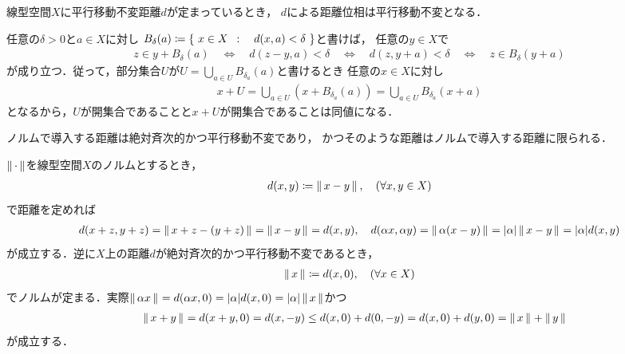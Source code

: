 	\begin{screen}
		\begin{thm}[平行移動不変距離による距離位相は平行移動不変]
			線型空間$X$に平行移動不変距離$d$が定まっているとき，
			$d$による距離位相は平行移動不変となる．
		\end{thm}
	\end{screen}
	
	\begin{prf}
		任意の$\delta>0$と$a \in X$に対し
		$B_\delta(a) \coloneqq \left\{\ x \in X\ \, : \quad d(x,a) < \delta\ \right\}$と書けば，
		任意の$y \in X$で
		\begin{align}
			z \in y + B_\delta(a)
			\quad \Longleftrightarrow \quad
			d(z-y,a) < \delta
			\quad \Longleftrightarrow \quad
			d(z,y+a) < \delta
			\quad \Longleftrightarrow \quad
			z \in B_\delta(y+a)
		\end{align}
		が成り立つ．従って，部分集合$U$が$U = \bigcup_{a \in U}B_{\delta_a}(a)$と書けるとき
		任意の$x \in X$に対し
		\begin{align}
			x + U = \bigcup_{a \in U} \left(x+B_{\delta_a}(a)\right)
			= \bigcup_{a \in U} B_{\delta_a}(x+a)
		\end{align}
		となるから，$U$が開集合であることと$x + U$が開集合であることは同値になる．
		\QED
	\end{prf}
	
	\begin{screen}
		\begin{thm}[絶対斉次的かつ平行移動不変な距離はノルムで導入する距離に限られる]
			ノルムで導入する距離は絶対斉次的かつ平行移動不変であり，
			かつそのような距離はノルムで導入する距離に限られる．
		\end{thm}
	\end{screen}
	
	\begin{prf}
		$\left\|\, \cdot\, \right\|_{}$を線型空間$X$のノルムとするとき，
		\begin{align}
			d(x,y) \coloneqq \left\|\, x-y\, \right\|_{}, \quad (\forall x,y \in X)
		\end{align}
		で距離を定めれば
		\begin{align}
			d(x+z,y+z) = \left\|\, x+z-(y+z)\, \right\|_{} = \left\|\, x-y\, \right\|_{} = d(x,y),
			\quad d(\alpha x, \alpha y)
			= \left\|\, \alpha (x-y)\, \right\|_{} = |\alpha|\left\|\, x-y\, \right\|_{} = |\alpha|d(x,y)
		\end{align}
		が成立する．逆に$X$上の距離$d$が絶対斉次的かつ平行移動不変であるとき，
		\begin{align}
			\left\|\, x\, \right\|_{} \coloneqq d(x,0),\quad (\forall x \in X)
		\end{align}
		でノルムが定まる．実際$\left\|\, \alpha x\, \right\|_{} = d(\alpha x,0) 
		= |\alpha|d(x,0) = |\alpha|\left\|\, x\, \right\|_{}$かつ
		\begin{align}
			\quad \left\|\, x+y\, \right\|_{} = d(x+y,0) = d(x,-y) 
			\leq d(x,0) + d(0,-y) = d(x,0) + d(y,0) = \left\|\, x\, \right\|_{} + \left\|\, y\, \right\|_{}
		\end{align}
		が成立する．
		\QED
	\end{prf}
	
